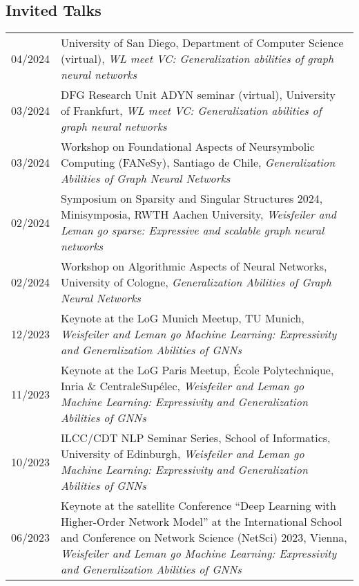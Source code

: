 \documentclass[11pt, a4paper, DIV=14, headings=small]{scrartcl}
\begin{document}
	\subsection*{Invited Talks}
	\begin{longtabu}{p{2.1cm}p{12.0cm}}
		   04/2024 & University of San Diego, Department of Computer Science (virtual), \emph{WL meet VC: Generalization abilities of graph neural networks}\\ 
	     03/2024 & DFG Research Unit ADYN seminar (virtual), University of Frankfurt, \emph{WL meet VC: Generalization abilities of graph neural networks}\\
	     03/2024 & Workshop on Foundational Aspects of Neursymbolic Computing (FANeSy), Santiago de Chile, \emph{Generalization Abilities of Graph Neural Networks}\\ 
  	02/2024 & Symposium on Sparsity and Singular Structures 2024, Minisymposia, RWTH Aachen University, \emph{Weisfeiler and Leman go sparse: Expressive and scalable graph neural networks}\\   
	     02/2024 & Workshop on Algorithmic Aspects of Neural Networks, University of Cologne, \emph{Generalization Abilities of Graph Neural Networks}\\    
        12/2023 & Keynote at the LoG Munich Meetup, TU Munich, \emph{Weisfeiler and Leman go Machine Learning: Expressivity and Generalization Abilities of GNNs}\\             
		11/2023 & Keynote at the LoG Paris Meetup, École Polytechnique, Inria \& CentraleSupélec, \emph{Weisfeiler and Leman go Machine Learning: Expressivity and Generalization Abilities of GNNs}\\    
		10/2023 & ILCC/CDT NLP Seminar Series, School of Informatics, University of Edinburgh, \emph{Weisfeiler and Leman go Machine Learning: Expressivity and Generalization Abilities of GNNs}\\    
		06/2023 & Keynote at the satellite Conference ``Deep Learning with Higher-Order Network Model'' at the International School
		and Conference on Network Science (NetSci) 2023, Vienna, \emph{Weisfeiler and Leman go Machine Learning: Expressivity and Generalization Abilities of GNNs}\\                                                                                                                     

\end{longtabu}
\end{document}
